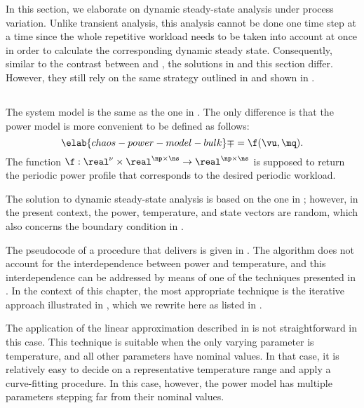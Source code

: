 In this section, we elaborate on dynamic steady-state analysis under process
variation. Unlike transient analysis, this analysis cannot be done one time step
at a time since the whole repetitive workload needs to be taken into account at
once in order to calculate the corresponding dynamic steady state. Consequently,
similar to the contrast between  and
, the solutions in
 and this section differ. However, they still
rely on the same strategy outlined in  and
shown in .

\subsection{\problemtitle}

The system model is the same as the one in . The
only difference is that the power model is more convenient to be defined as
follows:
\begin{equation} \elab{chaos-power-model-bulk}
  \mp = \f(\vu, \mq).
\end{equation}
The function $\f: \real^\nu \times \real^{\np \times \ns} \to \real^{\np \times
\ns}$ is supposed to return the periodic power profile that corresponds to the
desired periodic workload.

The solution to dynamic steady-state analysis is based on the one in
; however, in the present context, the
power, temperature, and state vectors are random, which also concerns the
boundary condition in .

The pseudocode of a procedure that delivers \mq is given in
. The algorithm does not account for the
interdependence between power and temperature, and this interdependence can be
addressed by means of one of the techniques presented in
. In the context of this chapter, the most
appropriate technique is the iterative approach illustrated in
, which we rewrite here as listed in
.

\begin{remark}
The application of the linear approximation described in
 is not straightforward in this case. This
technique is suitable when the only varying parameter is temperature, and all
other parameters have nominal values. In that case, it is relatively easy to
decide on a representative temperature range and apply a curve-fitting
procedure. In this case, however, the power model has multiple parameters
stepping far from their nominal values.
\end{remark}

